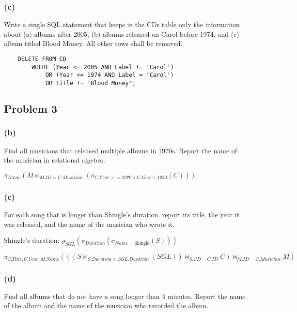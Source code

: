\documentclass{article}
\begin{document}
\subsubsection*{(c)}
Write a single SQL statement that keeps in the CDs table only the information
about (a) albums after 2005, (b) albums released on Carol before 1974, and (c)
album titled Blood Money. All other rows shall be removed.\newline

\begin{verbatim}
    DELETE FROM CD
        WHERE (Year <= 2005 AND Label != 'Carol')
            OR (Year <= 1974 AND Label = 'Carol')
            OR Title != 'Blood Money';
\end{verbatim}

\subsection*{Problem 3}

\subsubsection*{(b)}
Find all musicians that released multiple albums in 1970s. Report the name of
the musician in relational algebra. \newline

$\pi_{Name}(M \bowtie_{M.ID = C.Musician}(\sigma_{C.Year >= 1970 \land 
C.Year < 1980}(C)))$

\subsubsection*{(c)}
For each song that is longer than Shingle's duration, report its title, the year it was
released, and the name of the musician who wrote it. \newline

Shingle's duration: $\rho_{SGL}(\pi_{Duration}(\sigma_{Name = \text{Shingle}}
(S)))$

$\pi_{S.Title, C.Year, M.Name}(((S \bowtie_{S.Duration > SGL.Duration}(SGL)) 
    \bowtie_{S.CD = C.ID} C) \bowtie_{M.ID = C.Musician} M)$

\subsubsection*{(d)}
Find all albums that do not have a song longer than 4 minutes. Report the name 
of the album and the name of the musician who recorded the album. \newline
\end{document}
